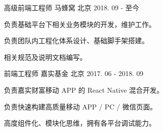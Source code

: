 

\begin{cventries}

  \cventry
    {高级前端工程师} %
    {马蜂窝} %
    {北京} %
    {2018. 09 - 至今} %
    {
      \begin{cvitems} %
        \item {负责基础平台下相关业务模块的开发，维护工作。}
        \item {负责团队内工程化体系设计、基础脚手架搭建。}
        \item {相关规范及说明文档编写。}
      \end{cvitems}
    }

  \cventry
    {前端工程师} %
    {嘉实基金} %
    {北京} %
    {2017. 06  - 2018. 09 } %
    {
      \begin{cvitems} %
        \item {负责嘉实财富移动 APP 的 React Native 混合开发。}
        \item {负责快速构建高质量移动 APP / PC / 微信页面。}
        \item {高度组件化、模块化思维，拥有各平台调试能力。}
      \end{cvitems}
    }

\end{cventries}
